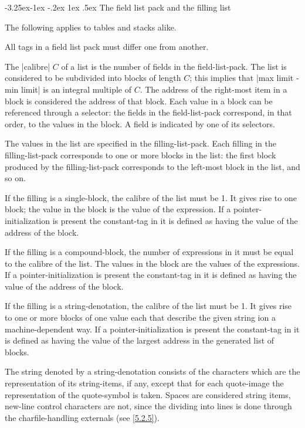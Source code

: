 \documentclass{article}
\makeatletter
\newcommand\g[1]{{\sf #1}}
\newcounter{subsubsubsection}[subsubsection]
\newcommand\subsubsubsection{%
\@startsection{subsubsubsection}{4}{\z@}%
   {-3.25ex\@plus -1ex \@minus -.2ex}%
   {1ex \@plus .5ex}%
   {\normalfont\normalsize\bfseries}}
\let\oref\ref
\let\ref\oref
\makeatother
\begin{document}
\subsubsubsection{The field list pack and the filling list}\label{4.1.5.2}

The following applies to tables and stacks alike.

\smallskip

All \g{tag}s in a \g{field list pack} must differ one from another.

The \pp|calibre| $C$ of a list is the number of \g{field}s in the
\g{field-list-pack}. The list is considered to be subdivided into blocks of length
$C$; this implies that \pp|max limit - min limit| is an integral multiple of
$C$. The address of the right-most item in a block is considered the address
of that block. Each value in a block can be referenced through a
\g{selector}: the \g{field}s in the \g{field-list-pack} correspond, in that
order, to the values in the block. A \g{field} is indicated by one of its
\g{selector}s.

The values in the list are specified in the \g{filling-list-pack}. Each
\g{filling} in the \g{filling-list-pack} corresponds to one or more blocks
in the list: the first block produced by the \g{filling-list-pack}
corresponds to the left-most block in the list,
and so on.

If the \g{filling} is a \g{single-block}, the calibre of the list must be 1.
It gives rise to one block; the value in the block is the value of the
\g{expression}. If a \g{pointer-initialization} is present the \g{constant-tag}
in it is defined as having the value of the address of the block.

If the \g{filling} is a \g{compound-block}, the number of \g{expression}s
in it must be equal to the calibre of the list. The values in the block are
the values of the \g{expression}s. If a \g{pointer-initialization} is present
the \g{constant-tag} in it is defined as having the value of the address of
the block.

If the \g{filling} is a \g{string-denotation}, the calibre of the list must
be 1. It gives rise to one or more blocks of one value each that describe the
given string ion a machine-dependent way. If a \g{pointer-initialization} is
present the \g{constant-tag} in it is defined as having the value of the
largest address in the generated list of blocks.

The string denoted by a \g{string-denotation} consists of the characters
which are the representation of its \g{string-item}s, if any, except that for
each \g{quote-image} the representation of the \g{quote-symbol} is taken.
Spaces are considered \g{string item}s, new-line control characters are not, 
since the dividing into
lines is done through the charfile-handling externals (see \ref{5.2.5}).
\end{document}

